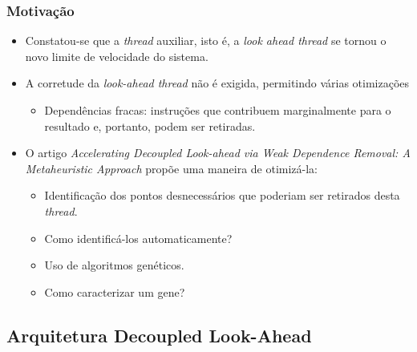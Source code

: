 \documentclass[10pt]{beamer}
\begin{document}
\begin{frame}
\frametitle{Motivação}

\begin{itemize}
\item Constatou-se que a \textit{thread} auxiliar, isto é, a \textit{look ahead
thread} se tornou o novo limite de velocidade do sistema.

\item A corretude da \textit{look-ahead thread} não é exigida, permitindo várias
otimizações

\begin{itemize} 
	\item Dependências fracas: instruções que contribuem marginalmente para o
	resultado e, portanto, podem ser retiradas.
	
\end{itemize} 

\item O artigo \textit{Accelerating Decoupled
Look-ahead via Weak Dependence Removal: A Metaheuristic Approach} propõe uma
maneira de otimizá-la:
 
\begin{itemize} 
	\item Identificação dos pontos desnecessários que poderiam ser retirados desta
	\textit{thread}. 
	
	\item Como identificá-los automaticamente?
	 
	\item Uso de algoritmos genéticos.
  
  	\item Como caracterizar um gene? 
	
\end{itemize} 
\end{itemize}

\end{frame}

\subsection{Arquitetura Decoupled Look-Ahead}
\end{document}
